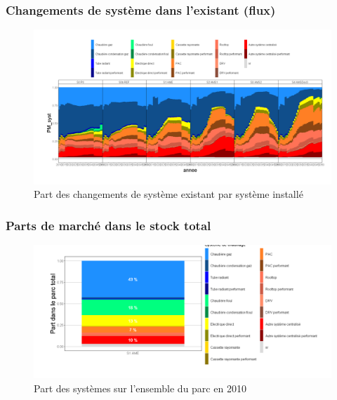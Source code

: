 \documentclass[]{article}
\begin{document}
\newpage

\subsubsection{Changements de système dans l'existant
(flux)}\label{changements-de-systeme-dans-lexistant-flux}

\begin{figure}
\centering
\includegraphics{Exemple_sortiestertiaire_files/figure-latex/Evol_PM_syst-1.png}
\caption{Part des changements de système existant par système installé}
\end{figure}

\clearpage
\newpage

\subsubsection{Parts de marché dans le stock
total}\label{parts-de-marche-dans-le-stock-total}

\begin{figure}
\centering
\includegraphics{Exemple_sortiestertiaire_files/figure-latex/Evol_PM_syst_all_2010-1.png}
\caption{Part des systèmes sur l'ensemble du parc en 2010}
\end{figure}
\end{document}
